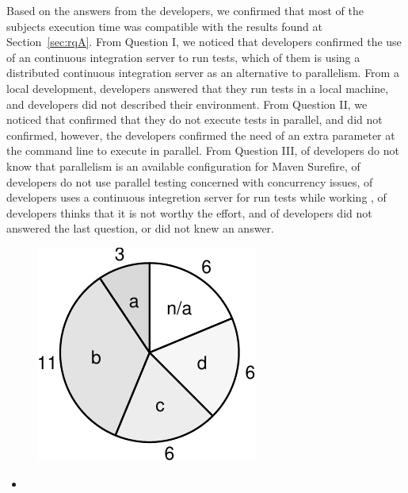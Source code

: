 Based on the answers from the developers, we confirmed that most of
the subjects execution time was compatible with the results found at
Section~\ref{sec:rqA}. From Question I, we noticed that \emailsCI{}
developers confirmed the use of an continuous integration server to
run tests, which \emailsDistributed{} of them is using a distributed
continuous integration server as an alternative to parallelism.
From a local development, \emailsLocal{} developers answered that they
run tests in a local machine, and \emailsNotDescribed{} developers did
not described their environment.
From Question II, we noticed that \emailsSequential{} confirmed that
they do not execute tests in parallel, and \emailsParallel{} did not
confirmed, however, the developers confirmed the need of an extra
parameter at the command line to execute in parallel.
From Question III, \emailsA{} of developers do not know that
parallelism is an available configuration for Maven Surefire,
\emailsB{} of developers do not use parallel testing concerned with
concurrency issues, \emailsD{} of developers uses a continuous
integretion server for run tests while working , \emailsD{} of developers thinks that
it is not worthy the effort, and \emailsNA{} of developers did not
answered the last question, or did not knew an answer.

\begin{figure}[h!]
    \centering
    \includegraphics[width=.15\textwidth]{plots/survey.pdf}
    \caption{\label{fig:rq5-answers}}
\end{figure}


\begin{center}
\end{center}

\begin{itemize}
    \item \textbf{\RQF{}}
\end{itemize}

